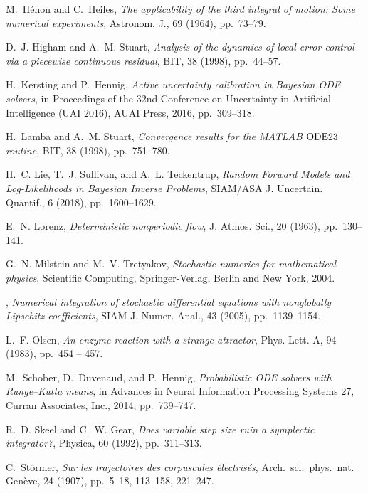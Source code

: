 \documentclass[10pt]{article}
\begin{document}
\begin{thebibliography}{10}
	{\sc M.~H\'enon and C.~Heiles}, {\em The applicability of the third integral of
		motion: {S}ome numerical experiments}, Astronom. J., 69 (1964), pp.~73--79.
	
	{\sc D.~J. Higham and A.~M. Stuart}, {\em Analysis of the dynamics of local
		error control via a piecewise continuous residual}, BIT, 38 (1998),
	pp.~44--57.
	
	{\sc H.~Kersting and P.~Hennig}, {\em Active uncertainty calibration in
		{B}ayesian {ODE} solvers}, in Proceedings of the 32nd Conference on
	Uncertainty in Artificial Intelligence (UAI 2016), {AUAI} Press, 2016,
	pp.~309--318.
	
	{\sc H.~Lamba and A.~M. Stuart}, {\em Convergence results for the {MATLAB}
		{${\rm ODE}23$} routine}, BIT, 38 (1998), pp.~751--780.
	
	{\sc H.~C. Lie, T.~J. Sullivan, and A.~L. Teckentrup}, {\em Random {F}orward
		{M}odels and {L}og-{L}ikelihoods in {B}ayesian {I}nverse {P}roblems},
	SIAM/ASA J. Uncertain. Quantif., 6 (2018), pp.~1600--1629.
	
	{\sc E.~N. Lorenz}, {\em Deterministic nonperiodic flow}, J. Atmos. Sci., 20
	(1963), pp.~130--141.
	
	{\sc G.~N. Milstein and M.~V. Tretyakov}, {\em Stochastic numerics for
		mathematical physics}, Scientific Computing, Springer-Verlag, Berlin and New
	York, 2004.
	
	\leavevmode\vrule height 2pt depth -1.6pt width 23pt, {\em Numerical
		integration of stochastic differential equations with nonglobally {L}ipschitz
		coefficients}, SIAM J. Numer. Anal., 43 (2005), pp.~1139--1154.
	
	{\sc L.~F. Olsen}, {\em An enzyme reaction with a strange attractor}, Phys.
	Lett. A, 94 (1983), pp.~454 -- 457.
	
	{\sc M.~Schober, D.~Duvenaud, and P.~Hennig}, {\em Probabilistic {ODE} solvers
		with {R}unge--{K}utta means}, in Advances in Neural Information Processing Systems
	27, Curran Associates, Inc., 2014, pp.~739--747.
	
	{\sc R.~D. Skeel and C.~W. Gear}, {\em Does variable step size ruin a
		symplectic integrator?}, Physica, 60 (1992), pp.~311--313.
	
	{\sc C.~St\"ormer}, {\em Sur les trajectoires des corpuscules \'electris\'es},
	Arch.\ sci.\ phys.\ nat. Gen\`eve, 24 (1907), pp.~5--18, 113--158, 221--247.
	

\end{thebibliography}
\end{document}
